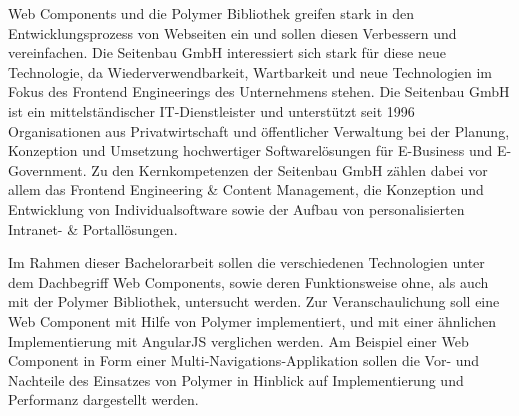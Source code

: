 Web Components und die Polymer Bibliothek greifen stark in den
Entwicklungsprozess von Webseiten ein und sollen diesen Verbessern und
vereinfachen. Die Seitenbau GmbH interessiert sich stark für diese neue
Technologie, da Wiederverwendbarkeit, Wartbarkeit und neue Technologien
im Fokus des Frontend Engineerings des Unternehmens stehen. Die
Seitenbau GmbH ist ein mittelständischer IT-Dienstleister und
unterstützt seit 1996 Organisationen aus Privatwirtschaft und
öffentlicher Verwaltung bei der Planung, Konzeption und Umsetzung
hochwertiger Softwarelösungen für E-Business und E-Government. Zu den
Kernkompetenzen der Seitenbau GmbH zählen dabei vor allem das Frontend
Engineering \& Content Management, die Konzeption und Entwicklung von
Individualsoftware sowie der Aufbau von personalisierten Intranet- \&
Portallösungen.

Im Rahmen dieser Bachelorarbeit sollen die verschiedenen Technologien
unter dem Dachbegriff Web Components, sowie deren Funktionsweise ohne,
als auch mit der Polymer Bibliothek, untersucht werden. Zur
Veranschaulichung soll eine Web Component mit Hilfe von Polymer
implementiert, und mit einer ähnlichen Implementierung mit AngularJS
verglichen werden. Am Beispiel einer Web Component in Form einer
Multi-Navigations-Applikation sollen die Vor- und Nachteile des
Einsatzes von Polymer in Hinblick auf Implementierung und Performanz
dargestellt werden.
